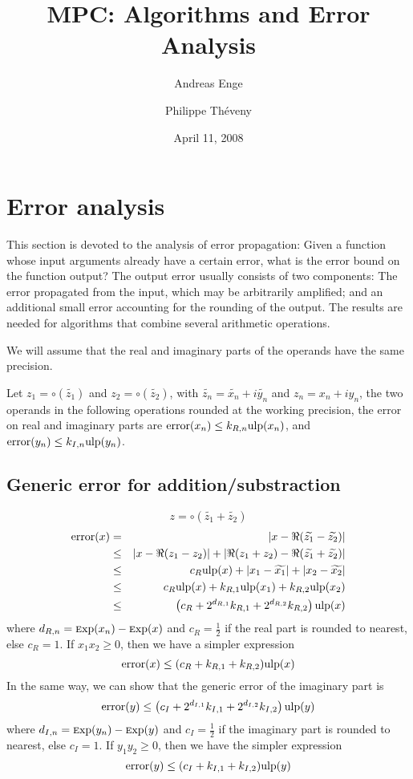 \documentclass {article}
\title {MPC: Algorithms and Error Analysis}
\author {Andreas Enge \and Philippe Th\'eveny}
\date {April 11, 2008}
\DeclareMathOperator{\error}{error}
\newcommand {\Ulp}{{\rm ulp}}
\newcommand {\Exp}{{\rm \textsc exp}}
\begin{document}
\maketitle
\tableofcontents


\section {Error analysis}

This section is devoted to the analysis of error propagation: Given a function
whose input arguments already have a certain error, what is the error bound on
the function output? The output error usually consists of two components: The
error propagated from the input, which may be arbitrarily amplified; and an
additional small error accounting for the rounding of the output. The results
are needed for algorithms that combine several arithmetic operations.

We will assume that the real and imaginary parts of the operands have the same
precision.

Let $z_1 = \circ(\widetilde{z_1})$ and $z_2 = \circ(\widetilde{z_2})$, with
$\widetilde{z_n} = \widetilde{x_n} + i \widetilde{y_n}$ and $z_n = x_n + i
y_n$, the two operands in the following operations rounded at the working
precision, the error on real and imaginary parts are $\error(x_n) \leq k_{R,n}
\Ulp(x_n)$, and $\error(y_n) \leq k_{I,n} \Ulp(y_n)$.

\subsection {Generic error for addition/substraction}

\[
z=\circ(\widetilde{z_1}+\widetilde{z_2})
\]
\begin{eqnarray}\nonumber
\error(x)&=&|x-\Re(\widetilde{z_1}-\widetilde{z_2})|\\\nonumber
&\leq&|x-\Re(z_1-z_2)|+|\Re(z_1+z_2)-\Re(\widetilde{z_1}+\widetilde{z_2})|\\\nonumber
&\leq&c_R \Ulp(x) + |x_1 - \widetilde{x_1}| + |x_2 -
\widetilde{x_2}|\\\nonumber &\leq&c_R \Ulp(x) + k_{R,1} \Ulp(x_1) + k_{R,2}
\Ulp(x_2)\\\nonumber &\leq&\left(c_R + 2^{d_{R,1}} k_{R,1} + 2^{d_{R,2}}
k_{R,2} \right) \Ulp(x) \nonumber
\end{eqnarray}
where $d_{R,n}=\Exp(x_n)-\Exp(x)$ and $c_R=\frac{1}{2}$ if the real part is
rounded to nearest, else $c_R=1$. If $x_1x_2 \geq 0$, then we have a simpler
expression
\[
\error(x) \leq (c_R+k_{R,1}+k_{R,2}) \Ulp(x)
\]
In the same way, we can show that the generic error of the imaginary part is
\[
\error (y) \leq \left(c_I + 2^{d_{I,1}} k_{I,1} + 2^{d_{I,2}} k_{I,2} \right)
\Ulp(y)
\]
where $d_{I,n}=\Exp(y_n)-\Exp(y)$ and $c_I=\frac{1}{2}$ if the imaginary part
is rounded to nearest, else $c_I=1$. If $y_1y_2 \geq 0$, then we have the
simpler expression
\[
\error(y) \leq (c_I+k_{I,1}+k_{I,2}) \Ulp(y)
\]
\end{document}
